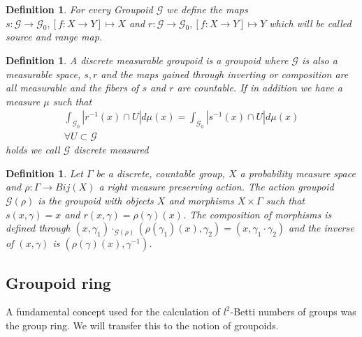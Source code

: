 \documentclass[12pt,a4paper]{scrartcl}
\newtheorem{Definition}[Theorem]{Definition}
\numberwithin{equation}{section}
\newcommand{\2}{\mathbb{Z} / 2 \mathbb{Z}}
\newcommand{\G}{\mathcal{G}}
\newcommand{\1}{\overline{1}}
\newcommand{\0}{\overline{0}}
\begin{document}
\begin{Definition}
	For every Groupoid $\mathcal{G}$ we define the maps $s: \mathcal{G} \to \mathcal{G}_0, [f:X \to Y] \mapsto X$ and $r: \mathcal{G} \to \mathcal{G}_0, [f:X \to Y] \mapsto Y$ which will be called source and range map.
\end{Definition}
\begin{Definition}
	A discrete measurable groupoid is a groupoid where $\mathcal{G}$ is also a measurable space, $s, r$ and the maps gained through inverting or composition are all measurable and the fibers of $s$ and $r$ are countable.
	If in addition we have a measure $\mu$ such that 
	\begin{align*}
		\int_{\mathcal{G}_0} |r^{-1}(x) \cap U| d\mu(x) = \int_{\mathcal{G}_0} |s^{-1}(x) \cap U| d\mu(x) \\ \forall U \subset \mathcal{G}
	\end{align*}
	holds we call $\mathcal{G}$ discrete measured
\end{Definition}
\begin{Definition}
	Let $\Gamma$ be a discrete, countable group, $X$ a probability measure space and $\rho: \Gamma \to Bij(X)$ a right measure preserving action. The action groupoid $\G(\rho)$ is the groupoid with objects $X$ and morphisms $X \times \Gamma$ such that $s(x,\gamma) = x$ and $r(x, \gamma) = \rho(\gamma) (x)$. The composition of morphisms is defined through $(x, \gamma_1) \cdot_{\G(\rho)} (\rho(\gamma_1) (x), \gamma_2) = (x, \gamma_1 \cdot \gamma_2)$ and the inverse of $(x, \gamma)$ is $(\rho(\gamma) (x), \gamma^{-1})$.
\end{Definition}

\subsection{Groupoid ring}
A fundamental concept used for the calculation of $l^2$-Betti numbers of groups was the group ring. We will transfer this to the notion of groupoids.
\end{document}

